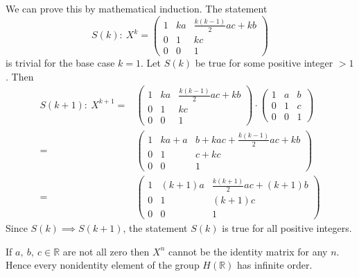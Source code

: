 \documentclass[12pt]{article}
\begin{document}
\begin{enumerate}
\begin{enumerate}
\begin{mybox}
            We can prove this by mathematical induction.
            The statement
            $$S(k):\ X^k=\left(\begin{array}{ccc}
                1 & ka & \frac{k(k-1)}{2}ac+kb\\
                0 & 1 & kc\\
                0 & 0 & 1 \end{array}
            \right)$$
            is trivial for the base case $k=1$. Let
            $S(k)$ be true for some positive integer
            $>1$. Then
                \begin{align*}
                S(k+1):\ X^{k+1}=&\left(\begin{array}{ccc}
                    1 & ka & \frac{k(k-1)}{2}ac+kb\\
                    0 & 1 & kc\\
                    0 & 0 & 1 \end{array}
                \right)\cdot
                \left(\begin{array}{ccc}
                    1 & a & b\\
                    0 & 1 & c\\
                    0 & 0 & 1 \end{array}
                \right)\\
                =&\left(\begin{array}{ccc}
                    1 & ka+a & b+kac+\frac{k(k-1)}{2}ac+kb\\
                    0 & 1 & c+kc\\
                    0 & 0 & 1 \end{array}
                \right)\\
                =&\left(\begin{array}{ccc}
                    1 & (k+1)a & \frac{k(k+1)}{2}ac+(k+1)b\\
                    0 & 1 & (k+1)c\\
                    0 & 0 & 1 \end{array}
                \right)
                \end{align*}
            Since $S(k)\implies S(k+1)$, the statement
            $S(k)$ is true for all positive integers.
            
            \vspace*{2mm}
            If $a,\ b,\ c \in \mathbb{R}$ are not all
            zero then $X^n$ cannot be the identity matrix
            for any $n$. Hence every nonidentity element
            of the group $H(\mathbb{R})$ has infinite order.
        \end{mybox}
    \end{enumerate}
  

\end{enumerate}
\end{document}
